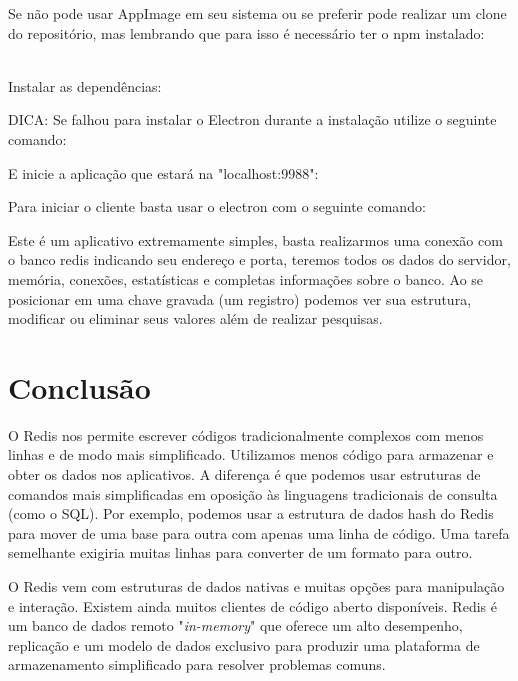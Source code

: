\documentclass[a4paper,11pt]{article}
\begin{document}
Se não pode usar AppImage em seu sistema ou se preferir pode realizar um clone do repositório, mas lembrando que para isso é necessário ter o npm instalado: \\
 \\

Instalar as dependências: \\

DICA: Se falhou para instalar o Electron durante a instalação utilize o seguinte comando: \\

E inicie a aplicação que estará na "localhost:9988": \\

Para iniciar o cliente basta usar o electron com o seguinte comando: \\

Este é um aplicativo extremamente simples, basta realizarmos uma conexão com o banco redis indicando seu endereço e porta, teremos todos os dados do servidor, memória, conexões, estatísticas e completas informações sobre o banco. Ao se posicionar em uma chave gravada (um registro) podemos ver sua estrutura, modificar ou eliminar seus valores além de realizar pesquisas.





\section{Conclusão}
O Redis nos permite escrever códigos tradicionalmente complexos com menos linhas e de modo mais simplificado. Utilizamos menos código para armazenar e obter os dados nos aplicativos. A diferença é que podemos usar estruturas de comandos mais simplificadas em oposição às linguagens tradicionais de consulta (como o SQL). Por exemplo, podemos usar a estrutura de dados hash do Redis para mover de uma base para outra com apenas uma linha de código. Uma tarefa semelhante exigiria muitas linhas para converter de um formato para outro. 

O Redis vem com estruturas de dados nativas e muitas opções para manipulação e interação. Existem ainda muitos clientes de código aberto disponíveis. Redis é um banco de dados remoto "\textit{in-memory}" que oferece um alto desempenho, replicação e um modelo de dados exclusivo para produzir uma plataforma de armazenamento simplificado para resolver problemas comuns. 
\end{document}
